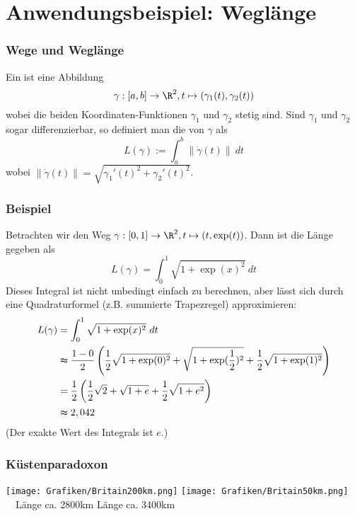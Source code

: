 %
%
\section{Anwendungsbeispiel: Weglänge}
\makeSectionDividerPage
%
%
\begin{frame}\frametitle{Wege und Weglänge}
Ein  ist eine Abbildung
$$
\gamma : [a,b] \to \R^2, t \mapsto (\gamma_1(t),\gamma_2(t))
$$
wobei die beiden Koordinaten-Funktionen $\gamma_1$ und $\gamma_2$ stetig sind. \pause
\vfill
Sind $\gamma_1$ und $\gamma_2$ sogar differenzierbar, so definiert man die  von $\gamma$ als
$$
L(\gamma):=\int_a^b \|\dot \gamma(t)\| \ dt
$$
wobei $\|\dot \gamma(t)\|=\sqrt{\gamma_1'(t)^2+\gamma_2'(t)^2}$.
\end{frame}
%
%
\begin{frame}\frametitle{Beispiel}
Betrachten wir den Weg $\gamma: [0,1] \to \R^2, t \mapsto (t,\exp(t))$. Dann ist die Länge gegeben als
$$
L(\gamma)=\int_0^1 \sqrt{1+\exp(x)^2} \ dt
$$\pause
Dieses Integral ist nicht unbedingt einfach zu berechnen, aber lässt sich durch eine Quadraturformel (z.B. summierte Trapezregel) approximieren:\pause \small
\begin{align*}
L(\gamma)&=\int_0^1 \sqrt{1+\exp(x)^2} \ dt \\
&\thickapprox \frac{1-0}{2}\left(\frac{1}{2}\sqrt{1+\exp(0)^2}+\sqrt{1+\exp(\frac{1}{2})^2} +\frac{1}{2}\sqrt{1+\exp(1)^2}\right)\\
&=\frac{1}{2}\left(\frac{1}{2}\sqrt{2}+\sqrt{1+e}+\frac{1}{2}\sqrt{1+e^2} \right)\\
&\thickapprox 2,042
\end{align*}
\vfill
(Der exakte Wert des Integrals ist $e$.)
\end{frame}
%
%
\begin{frame}\frametitle{Küstenparadoxon}
\texttt{[image: Grafiken/Britain200km.png]} 
\texttt{[image: Grafiken/Britain50km.png]} \\
\ \ Länge ca. 2800km \qquad Länge ca. 3400km
\end{frame}
%
